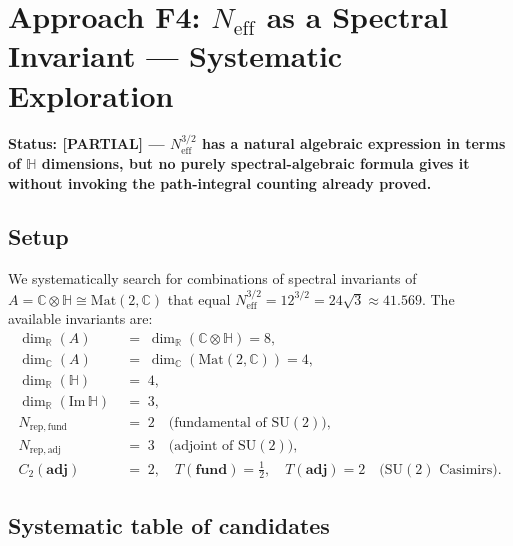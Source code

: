 \documentclass[11pt,a4paper]{article}
\theoremstyle{definition}
\theoremstyle{remark}
\begin{document}
\section{Approach F4: $N_{\mathrm{eff}}$ as a Spectral Invariant —
  Systematic Exploration}
\label{sec:F4}

\textbf{Status: [PARTIAL] — $N_{\mathrm{eff}}^{3/2}$ has a natural algebraic
expression in terms of $\mathbb{H}$ dimensions, but no purely spectral-algebraic
formula gives it without invoking the path-integral counting already proved.}

\subsection{Setup}

We systematically search for combinations of spectral invariants of
$A = \mathbb{C}\otimes\mathbb{H} \cong \mathrm{Mat}(2,\mathbb{C})$ that equal
$N_{\mathrm{eff}}^{3/2} = 12^{3/2} = 24\sqrt{3} \approx 41.569$.
The available invariants are:
\begin{align}
  \dim_\mathbb{R}(A) &\;=\; \dim_\mathbb{R}(\mathbb{C}\otimes\mathbb{H}) = 8,
    \label{eq:dimR_A}\\
  \dim_\mathbb{C}(A) &\;=\; \dim_\mathbb{C}(\mathrm{Mat}(2,\mathbb{C})) = 4,
    \label{eq:dimC_A}\\
  \dim_\mathbb{R}(\mathbb{H}) &\;=\; 4, \label{eq:dimR_H}\\
  \dim_\mathbb{R}(\mathrm{Im}\,\mathbb{H}) &\;=\; 3, \label{eq:dimR_ImH}\\
  N_{\mathrm{rep, fund}} &\;=\; 2 \quad\text{(fundamental of $\mathrm{SU}(2)$)},\\
  N_{\mathrm{rep, adj}} &\;=\; 3 \quad\text{(adjoint of $\mathrm{SU}(2)$)},\\
  C_2(\mathbf{adj}) &\;=\; 2, \quad T(\mathbf{fund}) = \tfrac{1}{2},
    \quad T(\mathbf{adj}) = 2 \quad\text{($\mathrm{SU}(2)$ Casimirs)}.
\end{align}

\subsection{Systematic table of candidates}
\end{document}
